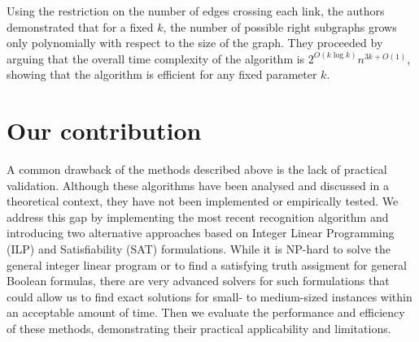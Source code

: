 Using the restriction on the number of edges crossing each link, the authors demonstrated that for a fixed \(k\), the number of possible right subgraphs grows only polynomially with respect to the size of the graph. They proceeded by arguing that the overall time complexity of the algorithm is \(2^{O(k \log k)}n^{3k + O(1)}\), showing that the algorithm is efficient for any fixed parameter \(k\).


\section{Our contribution}

A common drawback of the methods described above is the lack of practical validation. Although these algorithms have been analysed and discussed in a theoretical context, they have not been implemented or empirically tested. We address this gap by implementing the most recent recognition algorithm and introducing two alternative approaches based on Integer Linear Programming (ILP) and Satisfiability (SAT) formulations. While it is NP-hard to solve the general integer linear program or to find a satisfying truth assigment for general Boolean formulas, there are very advanced solvers for such formulations that could allow us to find exact solutions for small- to medium-sized instances within an acceptable amount of time. Then we evaluate the performance and efficiency of these methods, demonstrating their practical applicability and limitations.
